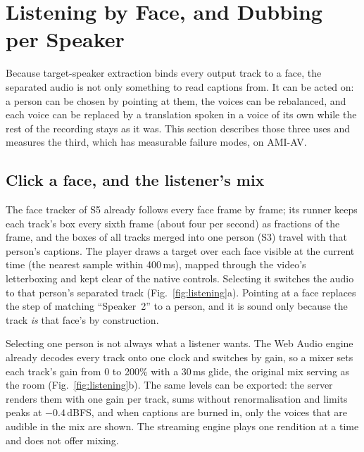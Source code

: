 \section{Listening by Face, and Dubbing per Speaker}
\label{sec:listening}

Because target-speaker extraction binds every output track to a face, the separated audio is not only something to read captions from. It can be acted on: a person can be chosen by pointing at them, the voices can be rebalanced, and each voice can be replaced by a translation spoken in a voice of its own while the rest of the recording stays as it was. This section describes those three uses and measures the third, which has measurable failure modes, on AMI-AV.

\subsection{Click a face, and the listener's mix}
The face tracker of S5 already follows every face frame by frame; its runner keeps each track's box every sixth frame (about four per second) as fractions of the frame, and the boxes of all tracks merged into one person (S3) travel with that person's captions. The player draws a target over each face visible at the current time (the nearest sample within 400\,ms), mapped through the video's letterboxing and kept clear of the native controls. Selecting it switches the audio to that person's separated track (Fig.~\ref{fig:listening}a). Pointing at a face replaces the step of matching ``Speaker~2'' to a person, and it is sound only because the track \emph{is} that face's by construction.

Selecting one person is not always what a listener wants. The Web Audio engine already decodes every track onto one clock and switches by gain, so a mixer sets each track's gain from 0 to 200\% with a 30\,ms glide, the original mix serving as the room (Fig.~\ref{fig:listening}b). The same levels can be exported: the server renders them with one gain per track, sums without renormalisation and limits peaks at $-0.4$\,dBFS, and when captions are burned in, only the voices that are audible in the mix are shown. The streaming engine plays one rendition at a time and does not offer mixing.

